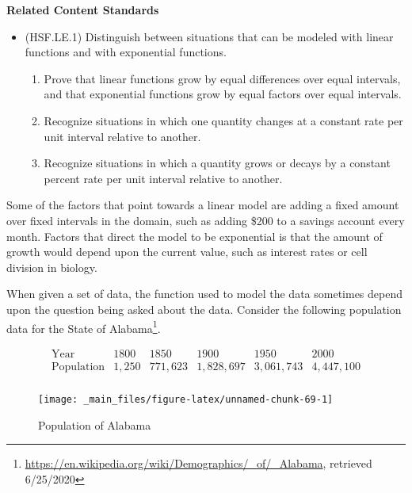 \documentclass[
]{book}
\providecommand{\tightlist}{%
  \setlength{\itemsep}{0pt}\setlength{\parskip}{0pt}}
\newenvironment{standards}{}{}
\theoremstyle{definition}
\theoremstyle{definition}
\theoremstyle{definition}
\theoremstyle{definition}
\theoremstyle{remark}
\begin{document}
\begin{standards}

\begin{center}
\textbf{Related Content Standards}

\end{center}

\begin{itemize}
\tightlist
\item
  (HSF.LE.1) Distinguish between situations that can be modeled with linear functions and with exponential functions.

  \begin{enumerate}
  \def\labelenumi{\alph{enumi}.}
  \tightlist
  \item
    Prove that linear functions grow by equal differences over equal intervals, and that exponential functions grow by equal factors over equal intervals.
  \item
    Recognize situations in which one quantity changes at a constant rate per unit interval relative to another.
  \item
    Recognize situations in which a quantity grows or decays by a constant percent rate per unit interval relative to another.
  \end{enumerate}
\end{itemize}

\end{standards}

Some of the factors that point towards a linear model are adding a fixed amount over fixed intervals in the domain, such as adding \$200 to a savings account every month. Factors that direct the model to be exponential is that the amount of growth would depend upon the current value, such as interest rates or cell division in biology.

When given a set of data, the function used to model the data sometimes depend upon the question being asked about the data. Consider the following population data for the State of Alabama\footnote{\url{https://en.wikipedia.org/wiki/Demographics/_of/_Alabama}, retrieved 6/25/2020}.

\[\begin{array}{c|ccccc}
 \mbox{Year} & 1800 & 1850 & 1900 & 1950 & 2000 \\ \hline
 \mbox{Population} & 1,250  & 771,623  & 1,828,697 & 3,061,743 & 4,447,100 \\
\end{array}\]

\begin{figure}

{\centering \texttt{[image: \_main\_files/figure-latex/unnamed-chunk-69-1]} 

}

\caption{Population of Alabama}\label{fig:unnamed-chunk-69}
\end{figure}
\end{document}
